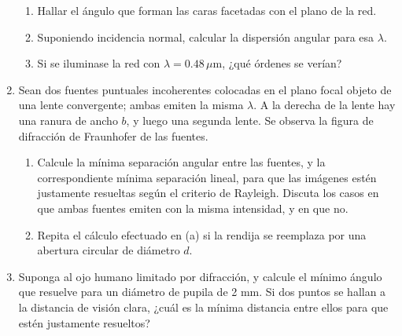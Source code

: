 \documentclass[11pt,spanish,a4paper]{article}
\begin{document}
\begin{enumerate}
\begin{enumerate}
\item Hallar el ángulo que forman las caras facetadas con el plano de la
red. 
\item Suponiendo incidencia normal, calcular la dispersión angular para
esa $\lambda$. 
\item Si se iluminase la red con $\lambda=0.48\,\mu$m, ¿qué órdenes se
verían?
\end{enumerate}


\item Sean dos fuentes puntuales incoherentes colocadas en el plano focal
objeto de una lente convergente; ambas emiten la misma $\lambda$.
A la derecha de la lente hay una ranura de ancho $b$, y luego una
segunda lente. Se observa la figura de difracción de Fraunhofer de
las fuentes.
\begin{enumerate}
\item Calcule la mínima separación angular entre las fuentes, y la correspondiente
mínima separación lineal, para que las imágenes estén justamente resueltas
según el criterio de Rayleigh. Discuta los casos en que ambas fuentes
emiten con la misma intensidad, y en que no. 
\item Repita el cálculo efectuado en (a) si la rendija se reemplaza por
una abertura circular de diámetro $d$.
\end{enumerate}


\item Suponga al ojo humano limitado por difracción, y calcule el mínimo
ángulo que resuelve para un diámetro de pupila de 2 mm. Si dos puntos
se hallan a la distancia de visión clara, ¿cuál es la mínima distancia
entre ellos para que estén justamente resueltos?\end{enumerate}
\end{document}
